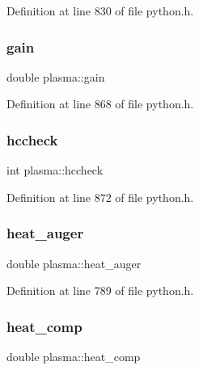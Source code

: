 Definition at line 830 of file python.\+h.

\mbox{\label{structplasma_abd08d926f7b31dc9ddfaf5bc0c02de8f}} 
\subsubsection{\texorpdfstring{gain}{gain}}
{\footnotesize\ttfamily double plasma\+::gain}



Definition at line 868 of file python.\+h.

\mbox{\label{structplasma_a4211e8aceb5ea7e09f9a359b99faa859}} 
\subsubsection{\texorpdfstring{hccheck}{hccheck}}
{\footnotesize\ttfamily int plasma\+::hccheck}



Definition at line 872 of file python.\+h.

\mbox{\label{structplasma_a878263d85482a81865eb7619b3b2a20e}} 
\subsubsection{\texorpdfstring{heat\+\_\+auger}{heat\_auger}}
{\footnotesize\ttfamily double plasma\+::heat\+\_\+auger}



Definition at line 789 of file python.\+h.

\mbox{\label{structplasma_ac6e1f1f8827b1bc1a68a437e1e58b001}} 
\subsubsection{\texorpdfstring{heat\+\_\+comp}{heat\_comp}}
{\footnotesize\ttfamily double plasma\+::heat\+\_\+comp}



